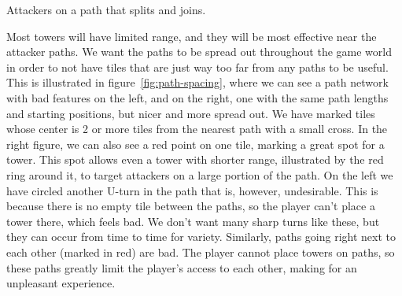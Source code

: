 \begin{center}
    \captionsetup{type=figure}
    \caption{Attackers on a path that splits and joins.}
    \label{fig:attackers-path-split}
\end{center}

Most towers will have limited range, and they will be most effective near the attacker paths.
We want the paths to be spread out throughout the game world in order to not have tiles that are just way too far from any paths to be useful.
This is illustrated in figure~\ref{fig:path-spacing}, where we can see a path network with bad features on the left, and on the right, one with the same path lengths and starting positions, but nicer and more spread out.
We have marked tiles whose center is 2 or more tiles from the nearest path with a small cross.
In the right figure, we can also see a red point on one tile, marking a great spot for a tower.
This spot allows even a tower with shorter range, illustrated by the red ring around it, to target attackers on a large portion of the path.
On the left we have circled another U-turn in the path that is, however, undesirable.
This is because there is no empty tile between the paths, so the player can't place a tower there, which feels bad.
We don't want many sharp turns like these, but they can occur from time to time for variety.
Similarly, paths going right next to each other (marked in red) are bad.
The player cannot place towers on paths, so these paths greatly limit the player's access to each other, making for an unpleasant experience.

